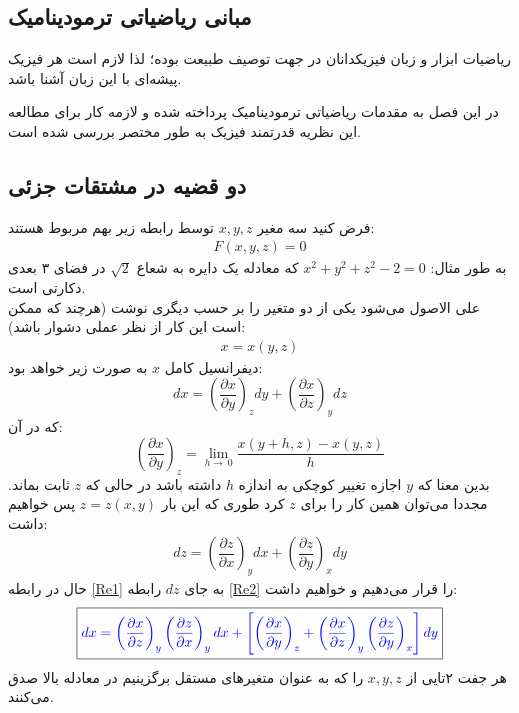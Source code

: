 \documentclass[12pt,a4paper]{article}							   %
\begin{document}
\begin{center}

\section*{مبانی ریاضیاتی ترمودینامیک
}

\end{center}

\thispagestyle{plain}
ریاضیات ابزار و زبان فیزیکدانان در جهت توصیف طبیعت بوده؛ لذا لازم است هر فیزیک پیشه‌ای با این زبان آشنا باشد. 

در این فصل به مقدمات ریاضیاتی ترمودینامیک پرداخته شده و لازمه کار برای مطالعه این نظریه قدرتمند فیزیک به طور مختصر بررسی شده است.
\\
\subsection{دو قضیه در مشتقات جزئی
}
فرض کنید سه مغیر
$x, y, z$
  توسط رابطه زیر بهم مربوط هستند:
\begin{align*}
F(x,y,z)=0
\end{align*}
به طور مثال:
$x^{2}+y^{2}+z^{2}-2=0$
که معادله یک دایره به شعاع
$\sqrt{2}$
در فضای ۳ بعدی دکارتی است.
\\
علی الاصول می‌شود یکی از دو متغیر را بر حسب دیگری نوشت (هرچند که ممکن است این کار از نظر عملی دشوار باشد):
\begin{align*}
x=x(y,z)
\end{align*}
دیفرانسیل کامل
$x$
به صورت زیر خواهد بود:
\begin{equation}\label{Re1}
dx=\left(\dfrac{\partial{x}}{\partial{y}}\right)_{z}dy+\left( \dfrac{\partial{x}}{\partial{z}}\right)_{y}dz
\end{equation}
که در آن:
\begin{equation*}
\left( \dfrac{\partial{x}}{\partial{y}}\right)_{z}=\lim_{h\to\ 0} \dfrac{x(y+h,z)-x(y,z)}{h}
\end{equation*}
بدین معنا که
$y$
اجازه تغییر کوچکی به اندازه
$h$
داشته باشد در حالی که
$z$
ثابت بماند.
مجددا می‌توان همین کار را برای
$z$
کرد طوری که این بار
$z=z(x,y)$
پس خواهیم داشت:
\begin{align}\label{Re2}
dz=\left( \dfrac{\partial{z}}{\partial{x}}\right)_{y}dx+\left( \dfrac{\partial{z}}{\partial{y}}\right)_{x}dy
\end{align}
حال در رابطه
\eqref{Re1}
به جای
$dz$
رابطه
\eqref{Re2}
را قرار می‌دهیم و خواهیم داشت:
\begin{align}\label{Re3}
\boxed{\textcolor{blue}{dx=\left(\dfrac{\partial x}{\partial z}\right)_{y}\left(\dfrac{\partial z}{\partial x}\right)_{y}dx+\left[ \left(\dfrac{\partial x}{\partial y}\right)_{z}+\left(\dfrac{\partial x}{\partial z}\right)_{y}\left(\dfrac{\partial z}{\partial y}\right)_{x}\right]dy}}
\end{align}
هر جفت ۲تایی از
$x, y, z$
را که به عنوان متغیرهای مستقل برگزینیم در معادله بالا صدق می‌کنند.
\end{document}
